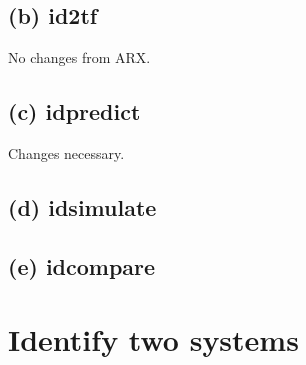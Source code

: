 \documentclass[]{article}
\begin{document}
\subsection{(b) id2tf}
No changes from ARX.

\subsection{(c) idpredict}
Changes necessary.

\subsection{(d) idsimulate}

\subsection{(e) idcompare}

\section{Identify two systems}
\end{document}
